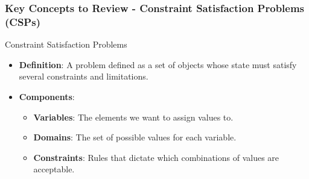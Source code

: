 \documentclass[aspectratio=169]{beamer}
\begin{document}
\begin{frame}[fragile]
    \frametitle{Key Concepts to Review - Constraint Satisfaction Problems (CSPs)}
    \begin{block}{Constraint Satisfaction Problems}
        \begin{itemize}
            \item \textbf{Definition}: A problem defined as a set of objects whose state must satisfy several constraints and limitations. 
            \item \textbf{Components}:
            \begin{itemize}
                \item \textbf{Variables}: The elements we want to assign values to.
                \item \textbf{Domains}: The set of possible values for each variable.
                \item \textbf{Constraints}: Rules that dictate which combinations of values are acceptable.
            \end{itemize}
        \end{itemize}
    \end{block}
\end{frame}
\end{document}
